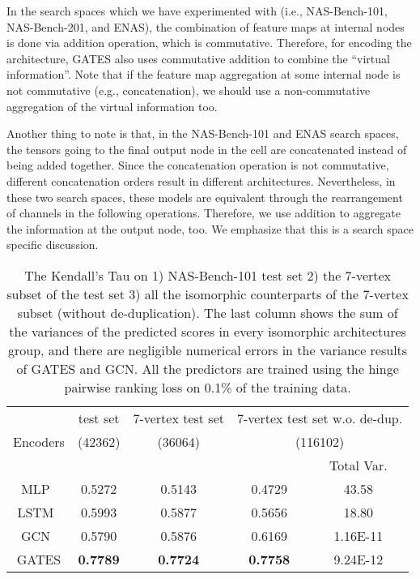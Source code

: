 \documentclass[runningheads]{llncs}
\begin{document}
In the search spaces which we have experimented with (i.e., NAS-Bench-101, NAS-Bench-201, and ENAS), the combination of feature maps at internal nodes is done via addition operation, which is commutative. Therefore, for encoding the architecture, GATES also uses commutative addition to combine the ``virtual information''.
Note that if the feature map aggregation at some internal node is not commutative (e.g., concatenation), we should use a non-commutative aggregation of the virtual information too.

Another thing to note is that, in the NAS-Bench-101 and ENAS search spaces, the tensors going to the final output node in the cell are concatenated instead of being added together.
Since the concatenation operation is not commutative, different concatenation orders result in different architectures. Nevertheless, in these two search spaces, these models are equivalent through the rearrangement of channels in the following operations.
Therefore, we use addition to aggregate the information at the output node, too. We emphasize that this is a search space specific discussion.


\begin{table}[tb]
\begin{center}
\caption{The Kendall's Tau  on 1) NAS-Bench-101 test set 2) the 7-vertex subset of the test set 3) all the isomorphic counterparts of the 7-vertex subset (without de-duplication). The last column shows the sum of the variances of the predicted scores in every isomorphic architectures group, and there are negligible numerical errors in the variance results of GATES and GCN. All the predictors are trained using the hinge pairwise ranking loss on 0.1\% of the training data.}
\label{table:iso-nb101}
\begin{tabular}{c@{\hskip 0.02\linewidth}cccc}
\toprule
\multirow{3}{*}{Encoders} & test set & 7-vertex test set & \multicolumn{2}{c}{7-vertex test set w.o. de-dup.} \\ 
& (42362) & (36064) & \multicolumn{2}{c}{(116102)} \\\cmidrule(lr){2-2}\cmidrule(lr){3-3}\cmidrule(lr){4-5}
&    & &   & Total Var.  \\\midrule
MLP~\cite{wang2018alphax}  & 0.5272 & 0.5143 & 0.4729 & 43.58    \\
LSTM~\cite{wang2018alphax} & 0.5993 & 0.5877 & 0.5656 & 18.80    \\
GCN~\cite{shi2019multi}    & 0.5790 & 0.5876 & 0.6169 & 1.16E-11 \\\hline
GATES                      & {\bf 0.7789} & {\bf 0.7724} & {\bf 0.7758} & 9.24E-12 \\ \bottomrule
\end{tabular}
\end{center}
\end{table}
\end{document}
